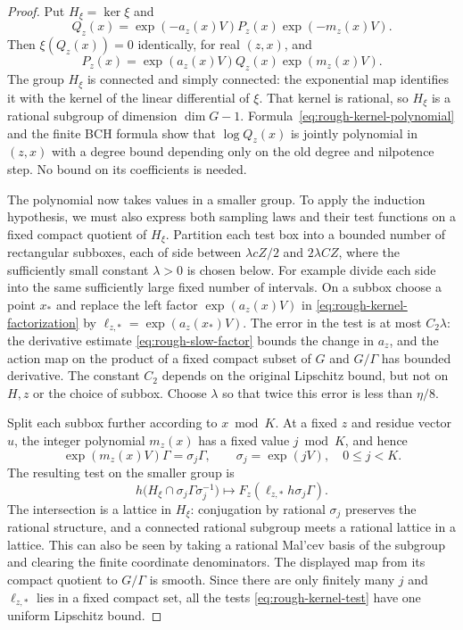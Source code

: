 \begin{proof}
Put $H_\xi=\ker\xi$ and
\begin{equation}
 Q_z(x)=\exp(-a_z(x)V)P_z(x)\exp(-m_z(x)V).
 \label{eq:rough-kernel-polynomial}
\end{equation}
Then $\xi(Q_z(x))=0$ identically, for real $(z,x)$, and
\begin{equation}
 P_z(x)=\exp(a_z(x)V)Q_z(x)\exp(m_z(x)V).
 \label{eq:rough-kernel-factorization}
\end{equation}
The group $H_\xi$ is connected and simply connected: the exponential
map identifies it with the kernel of the linear differential of
$\xi$.  That kernel is rational, so $H_\xi$ is a rational subgroup
of dimension $\dim G-1$.  Formula~\eqref{eq:rough-kernel-polynomial}
and the finite BCH formula show that $\log Q_z(x)$ is jointly
polynomial in $(z,x)$ with a degree bound depending only on the old
degree and nilpotence step.  No bound on its coefficients is needed.

The polynomial now takes values in a smaller group.  To apply the
induction hypothesis, we must also express both sampling laws and
their test functions on a fixed compact quotient of $H_\xi$.
Partition each test box into a bounded number of rectangular
subboxes, each of side between $\lambda cZ/2$ and $2\lambda CZ$,
where the sufficiently small constant $\lambda>0$ is chosen below.
For example divide each side into the same sufficiently large fixed
number of intervals.  On a subbox choose a point $x_*$ and replace the
left factor $\exp(a_z(x)V)$ in
\eqref{eq:rough-kernel-factorization} by
$\ell_{z,*}=\exp(a_z(x_*)V)$.  The error in the test is at most
$C_2\lambda$: the derivative estimate
\eqref{eq:rough-slow-factor} bounds the change in $a_z$, and the action
map on the product of a fixed compact subset of $G$ and $G/\Gamma$
has bounded derivative.  The constant $C_2$ depends on the original
Lipschitz bound, but not on $H,z$ or the choice of subbox.  Choose
$\lambda$ so that twice this error is less than $\eta/8$.

Split each subbox further according to $x\bmod K$.  At a fixed $z$
and residue vector $u$, the integer polynomial $m_z(x)$ has a fixed
value $j\bmod K$, and hence
\[
 \exp(m_z(x)V)\Gamma=\sigma_j\Gamma,
 \qquad\sigma_j=\exp(jV),\quad0\leq j<K.
\]
The resulting test on the smaller group is
\begin{equation}
 h\bigl(H_\xi\cap\sigma_j\Gamma\sigma_j^{-1}\bigr)
       \longmapsto F_z(\ell_{z,*}h\sigma_j\Gamma).
 \label{eq:rough-kernel-test}
\end{equation}
The intersection is a lattice in $H_\xi$: conjugation by rational
$\sigma_j$ preserves the rational structure, and a connected rational
subgroup meets a rational lattice in a lattice.  This can also be
seen by taking a rational Mal'cev basis of the subgroup and clearing
the finite coordinate denominators.  The displayed map from its
compact quotient to $G/\Gamma$ is smooth.  Since there are only
finitely many $j$ and $\ell_{z,*}$ lies in a fixed compact set,
all the tests \eqref{eq:rough-kernel-test} have one uniform Lipschitz
bound.


\end{proof}

